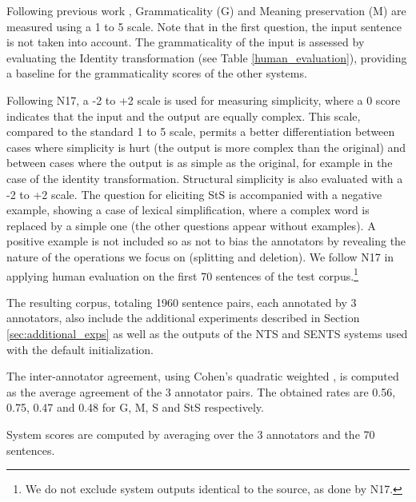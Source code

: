 \documentclass[11pt,a4paper]{article}
\begin{document}
Following previous work \citep[e.g.,][]{NG14,Xu16,Ni17}, Grammaticality (G) and Meaning preservation (M) are measured using a 1 to 5 scale. 
Note that in the first question, the input sentence is not taken into account. The grammaticality of the input is assessed by 
evaluating the Identity transformation (see Table \ref{human_evaluation}), providing a baseline for the grammaticality scores of the other systems.

Following N17, a -2 to +2 scale is used for measuring simplicity, where a 0 score indicates that the input and the output are equally complex. This scale, compared to the standard 1 to 5 scale, permits a better differentiation between cases where simplicity is hurt (the output is more complex than the original) and between cases where the output is as simple as the original, for example in the case of the identity transformation.
Structural simplicity is also evaluated with a -2 to +2 scale. 
The question for eliciting StS is accompanied with a negative example, showing a case of lexical simplification, where a complex word 
is replaced by a simple one (the other questions appear without examples). 
A positive example is not included so as not to bias the annotators by revealing the nature of the operations we focus on
(splitting and deletion). 
We follow N17 in applying human evaluation on the first 70 sentences of the test corpus.\footnote{We do not exclude system outputs identical to the source, as done by N17.}

The resulting corpus, totaling 1960 sentence pairs, each annotated by 3 annotators, also include the additional experiments described in Section \ref{sec:additional_exps} as well as the outputs of the NTS and SENTS systems used with the default initialization.

The inter-annotator agreement, using Cohen's quadratic weighted  \citep{C68}, is computed as the average agreement of the 3 annotator pairs.
The obtained rates are 0.56, 0.75, 0.47 and 0.48 for G, M, S and StS respectively.

System scores are computed by averaging over the 3 annotators and the 70 sentences.
\end{document}
